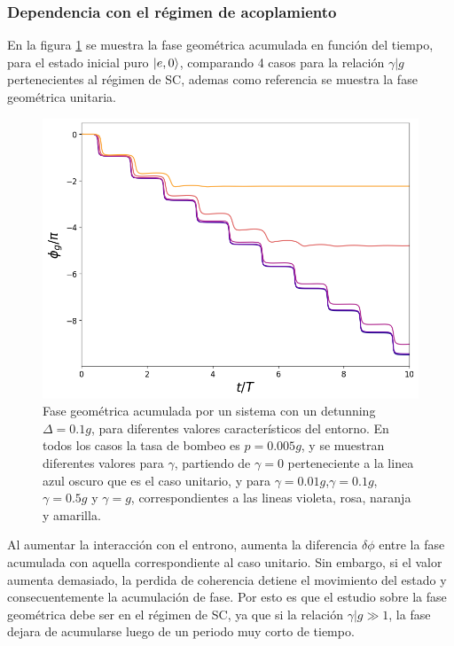\subsubsection{Dependencia con el régimen de acoplamiento}
En la figura \ref{fig3:fg gamma} se muestra la fase geométrica acumulada en función del tiempo, para el estado inicial puro $\ket{e,0}$, comparando 4 casos para la relación $\gamma|g$ pertenecientes al régimen de SC, ademas como referencia se muestra la fase geométrica unitaria.
\begin{figure}[H]
    \begin{minipage}[c]{0.67\textwidth}
        \includegraphics[width=\textwidth]{figuras/ch3/fg gamma.png}
      \end{minipage}\hfill
      \begin{minipage}[c]{0.3\textwidth}
        \caption{
            Fase geométrica acumulada por un sistema con un detunning $\Delta=0.1g$, para diferentes valores característicos del entorno. En todos los casos la tasa de bombeo es $p=0.005g$, y se muestran diferentes valores para $\gamma$, partiendo de $\gamma=0$ perteneciente a la linea azul oscuro que es el caso unitario, y para $\gamma=0.01g$,$\gamma=0.1g$,$\gamma=0.5g$ y $\gamma=g$, correspondientes a las lineas violeta, rosa, naranja y amarilla.
        } \label{fig3:fg gamma}
      \end{minipage}
\end{figure}
Al aumentar la interacción con el entrono, aumenta la diferencia $\delta \phi$ entre la fase acumulada con aquella correspondiente al caso unitario. Sin embargo, si el valor aumenta demasiado, la perdida de coherencia detiene el movimiento del estado y consecuentemente la acumulación de fase. Por esto es que el estudio sobre la fase geométrica debe ser en el régimen de SC, ya que si la relación $\gamma|g\gg 1$, la fase dejara de acumularse luego de un periodo muy corto de tiempo.


